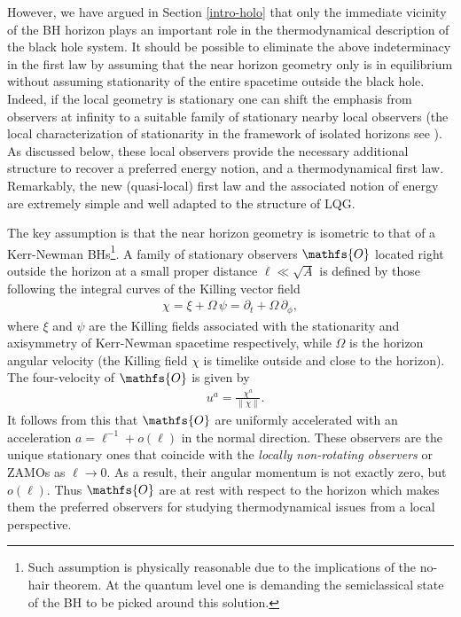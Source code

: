 \documentclass[aps, nofootinbib,superscriptaddress,12pt]{revtex4-2}
\def\be{\begin{equation}}
\def\ee{\end{equation}}
\newcommand{\mfs}[1]{\mathfs {#1}}                               %
\begin{document}
However, we have argued in Section \ref{intro-holo} that only the immediate vicinity of the BH horizon plays an important role in the thermodynamical description of the black hole system. It should be possible to eliminate the above indeterminacy in the first law by assuming that the near horizon geometry only is in equilibrium  without assuming stationarity of  the entire spacetime outside the black hole. 
Indeed, if the local geometry is stationary one can shift the emphasis from observers at infinity to  a suitable family of stationary nearby local observers (the local characterization of stationarity in the framework of isolated horizons see \cite{Lewandowski:2014nta}). As discussed below, these local observers provide the necessary additional structure to recover a preferred energy notion, and a thermodynamical first law. Remarkably, the new (quasi-local) first law and the associated notion of energy are extremely simple and well adapted to the structure of LQG.  

The key assumption is that the near horizon geometry is isometric to that of a  Kerr-Newman BHs\footnote{Such assumption is physically reasonable due to the implications of the no-hair theorem. At the quantum level one is demanding the semiclassical state of the BH to be picked around this solution.}.
A family of stationary observers $\mfs O$ located right outside the horizon at a small
proper distance $\ell\ll \sqrt{A}$ is defined by those following the integral
curves of the Killing vector field
%
\begin{eqnarray}
\chi=\xi+\Omega\,\psi=\partial_t+\Omega\,\partial_\phi,
\end{eqnarray}
%
where $\xi$  and $\psi$ are the Killing fields associated with the stationarity and axisymmetry of Kerr-Newman spacetime respectively, while $\Omega$ is the horizon angular velocity (the Killing field $\chi$ is timelike outside and close to the horizon). 
%
The four-velocity of $\mfs O$ is given by
%
\begin{align}\label{keyy}
&u^a=\frac{\chi^a}{\|\chi\|}.
\end{align}
%
It follows from this that $\mfs O$ are uniformly accelerated with an acceleration $a=\ell^{-1}+o(\ell)$ in the normal direction. 
These observers are the unique stationary ones that coincide with the {\em locally non-rotating observers} \cite{Wald:1984rg} or ZAMOs \cite{Thorne:1986iy} as $\ell\to 0$. As a result, their angular momentum is not exactly zero, but $o(\ell)$. 
Thus $\mfs O$ are at rest with respect to the horizon which makes them the preferred observers for studying thermodynamical issues from 
a local perspective.
\end{document}
